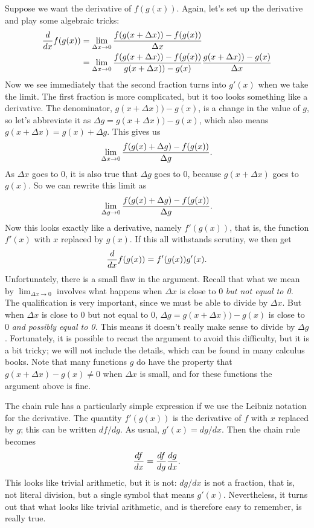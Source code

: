 Suppose we want the derivative of $f(g(x))$.
Again, let's set up the derivative and play some algebraic tricks:
\begin{align*}
{d\over dx}f(g(x))
&=\lim_{\Delta x\to0} {f(g(x+\Delta x))-f(g(x))\over\Delta x} \\
&=\lim_{\Delta x\to0} {f(g(x+\Delta x))-f(g(x))\over g(x+\Delta
  x))-g(x)} {g(x+\Delta x))-g(x)\over\Delta x} \\
\end{align*}
Now we see immediately that the second fraction turns into $g'(x)$
when we take the limit. The first fraction is more complicated, but it
too looks something like a derivative. The denominator, $g(x+\Delta
x))-g(x)$, is a change in the value of $g$, so let's abbreviate
it as $\Delta g=g(x+\Delta
x))-g(x)$, which also means $g(x+\Delta x)=g(x)+\Delta g$. This gives
us
$$\lim_{\Delta x\to0} {f(g(x)+\Delta g)-f(g(x))\over \Delta g}.$$
As $\Delta x$ goes to 0, it is also true that $\Delta g$ goes to 0,
because $g(x+\Delta x)$ goes to $g(x)$. So we can rewrite this limit
as
$$\lim_{\Delta g\to0} {f(g(x)+\Delta g)-f(g(x))\over \Delta g}.$$
Now this looks exactly like a derivative, namely $f'(g(x))$, that is,
the function $f'(x)$ with $x$ replaced by $g(x)$. If this all
withstands scrutiny, we then get
$${d\over dx}f(g(x))=f'(g(x))g'(x).$$
Unfortunately, there is a small flaw in the argument. Recall that what
we mean by $\lim_{\Delta x\to0}$ involves what happens when $\Delta x$
is close to 0 {\it but not equal to 0.} The qualification is very
important, since we must be able to divide by $\Delta x$.
But when $\Delta x$ is close to 0 but not equal to 0,
$\Delta g=g(x+\Delta
x))-g(x)$ is close to 0 {\it and possibly equal to 0.} This means it
doesn't really make sense to divide by $\Delta g$.
Fortunately, it is possible to recast the argument to avoid this
difficulty, but it is a bit tricky; we will not include the details,
which can be found in many calculus books. Note that many functions
$g$ do have the property that $g(x+\Delta x)-g(x)\not=0$ when $\Delta
x$ is small, and for these functions the argument above is fine.

The chain rule has a particularly simple expression if we use the
Leibniz notation for the derivative. The quantity $f'(g(x))$ is the
derivative of $f$ with $x$ replaced by $g$; this can be written 
$df/dg$. As usual, $g'(x)=dg/dx$. Then the chain rule becomes
$${df\over dx} = {df\over dg}{dg\over dx}.$$
This looks like trivial arithmetic, but it is not: $dg/dx$ is not a
fraction, that is, not literal division, but a single symbol that
means $g'(x)$. Nevertheless, it turns out that what looks like trivial
arithmetic, and is therefore easy to remember, is really true.

